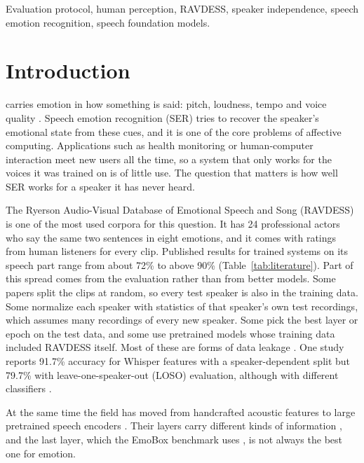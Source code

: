 \documentclass[journal]{IEEEtran}
\begin{document}
\begin{IEEEkeywords}
Evaluation protocol, human perception, RAVDESS, speaker independence, speech emotion recognition, speech foundation models.
\end{IEEEkeywords}

\section{Introduction}
 carries emotion in how something is said: pitch, loudness, tempo and voice quality \cite{schuller2018ser,elayadi2011survey}. Speech emotion recognition (SER) tries to recover the speaker's emotional state from these cues, and it is one of the core problems of affective computing. Applications such as health monitoring or human-computer interaction meet new users all the time, so a system that only works for the voices it was trained on is of little use. The question that matters is how well SER works for a speaker it has never heard.

The Ryerson Audio-Visual Database of Emotional Speech and Song (RAVDESS) \cite{livingstone2018ravdess} is one of the most used corpora for this question. It has 24 professional actors who say the same two sentences in eight emotions, and it comes with ratings from human listeners for every clip. Published results for trained systems on its speech part range from about 72\% to above 90\% (Table~\ref{tab:literature}). Part of this spread comes from the evaluation rather than from better models. Some papers split the clips at random, so every test speaker is also in the training data. Some normalize each speaker with statistics of that speaker's own test recordings, which assumes many recordings of every new speaker. Some pick the best layer or epoch on the test data, and some use pretrained models whose training data included RAVDESS itself. Most of these are forms of data leakage \cite{kapoor2023leakage}. One study reports 91.7\% accuracy for Whisper features with a speaker-dependent split but 79.7\% with leave-one-speaker-out (LOSO) evaluation, although with different classifiers \cite{george2025whisper}.

At the same time the field has moved from handcrafted acoustic features to large pretrained speech encoders \cite{baevski2020wav2vec,hsu2021hubert,chen2022wavlm,babu2022xlsr,radford2023whisper}. Their layers carry different kinds of information \cite{pasad2021layerwise,li2022exploration}, and the last layer, which the EmoBox benchmark uses \cite{ma2024emobox}, is not always the best one for emotion.
\end{document}
